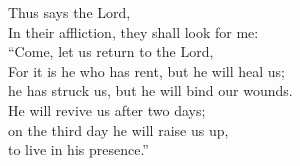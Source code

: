 \lettrine[lines=2]{T}{}hus says the Lord, \\In their affliction, they shall look for me:\\
   “Come, let us return to the Lord,\\
For it is he who has rent, but he will heal us;\\
   he has struck us, but he will bind our wounds.\\
He will revive us after two days;\\
   on the third day he will raise us up,\\
   to live in his presence.”